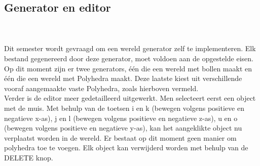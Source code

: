 \subsection{Generator en editor}
\\\\
Dit semester wordt gevraagd om een wereld generator zelf te implementeren. Elk bestand gegenereerd door deze generator, moet voldoen aan de opgestelde eisen. Op dit moment zijn er twee generators, één die een wereld met bollen maakt en één die een wereld met Polyhedra maakt. Deze laatste kiest uit verschillende vooraf aangemaakte vaste Polyhedra, zoals hierboven vermeld.%
\\

\noindent
Verder is de editor meer gedetailleerd uitgewerkt. Men selecteert eerst een object met de muis. Met behulp van de toetsen i en k (bewegen volgens positieve en negatieve x-as), j en l (bewegen volgens positieve en negatieve z-as), u en o (bewegen volgens positieve en negatieve y-as), kan het aangeklikte object nu verplaatst worden in de wereld. Er bestaat op dit moment geen manier om polyhedra toe te voegen. Elk object kan verwijderd worden met behulp van de DELETE knop.